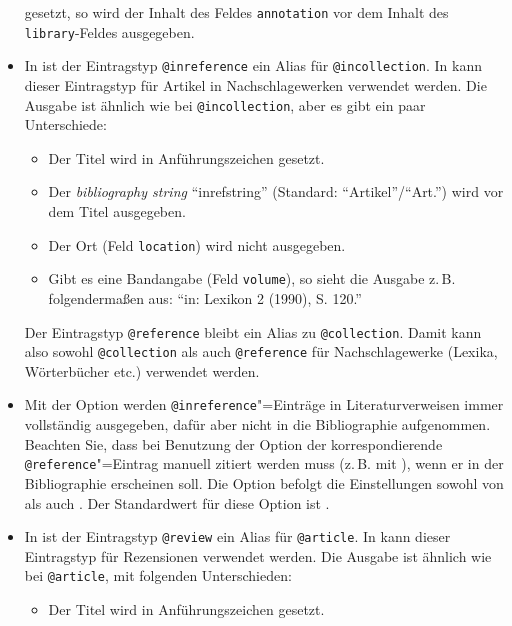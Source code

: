 \documentclass[ngerman]{scrartcl}
\begin{document}
\begin{itemize}
	       gesetzt, so wird der Inhalt des Feldes \texttt{annotation}
	      vor dem Inhalt des \texttt{library}-Feldes ausgegeben.
	\item In
        \bl{} ist der Eintragstyp \texttt{@inreference} ein Alias für
	      \texttt{@incollection}. In \bldw{} kann dieser Eintragstyp für
	      Artikel in Nachschlagewerken verwendet werden. Die Ausgabe ist ähnlich
	      wie bei \texttt{@incollection}, aber es gibt ein paar Unterschiede:
	      \begin{itemize}
          \item Der Titel wird in Anführungszeichen gesetzt.
          \item Der \textit{bibliography string} \enquote{inrefstring} (Standard:
                \enquote{Artikel}\slash\enquote{Art.}) wird vor dem Titel ausgegeben.
          \item Der Ort (Feld \texttt{location}) wird nicht ausgegeben.
          \item Gibt es eine Bandangabe (Feld \texttt{volume}), so sieht die Ausgabe
                z.\,B. folgendermaßen aus: \enquote{in: Lexikon 2 (1990), S. 120.}
        \end{itemize}
        Der Eintragstyp \texttt{@reference} bleibt ein Alias zu \texttt{@collection}.
        Damit kann also sowohl \texttt{@collection} als auch \texttt{@reference} für
        Nachschlagewerke (Lexika, Wörterbücher etc.) verwendet werden.
  \item Mit der Option  werden
  			\texttt{@inreference}"=Einträge in Literaturverweisen immer vollständig ausgegeben,
				dafür aber nicht in die Bibliographie aufgenommen. Beachten Sie, dass bei Benutzung
				der Option  der korrespondierende \texttt{@reference}"=Eintrag
				manuell zitiert werden muss (z.\,B. mit ), wenn er in der Bibliographie
				erscheinen soll. Die Option  befolgt die Einstellungen sowohl 
				von  als auch . Der Standardwert für diese
				Option ist . 
	\item In
        \bl{} ist der Eintragstyp \texttt{@review} ein Alias für
	      \texttt{@article}. In \bldw{} kann dieser Eintragstyp für
        Rezensionen verwendet werden. Die Ausgabe ist ähnlich wie bei 
        \texttt{@article}, mit folgenden Unterschieden:
        \begin{itemize}
          \item Der Titel wird in Anführungszeichen gesetzt.

\end{itemize}
\end{itemize}
\end{document}
